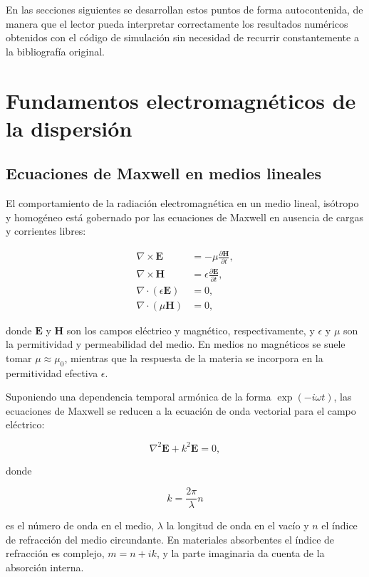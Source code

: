 \documentclass[12pt,a4paper]{article}
\begin{document}
En las secciones siguientes se desarrollan estos puntos de forma autocontenida, de manera que el lector pueda interpretar correctamente los resultados numéricos obtenidos con
el código de simulación sin necesidad de recurrir constantemente a la bibliografía original.


\section{Fundamentos electromagnéticos de la dispersión}

\subsection{Ecuaciones de Maxwell en medios lineales}

El comportamiento de la radiación electromagnética en un medio lineal, isótropo y homogéneo está gobernado por las ecuaciones de Maxwell en ausencia de cargas y corrientes libres:

\begin{align}
  \nabla \times \mathbf{E} &= -\mu \frac{\partial \mathbf{H}}{\partial t}, \\
  \nabla \times \mathbf{H} &=  \epsilon \frac{\partial \mathbf{E}}{\partial t}, \\
  \nabla \cdot (\epsilon \mathbf{E}) &= 0, \\
  \nabla \cdot (\mu \mathbf{H}) &= 0,
\end{align}

donde $\mathbf{E}$ y $\mathbf{H}$ son los campos eléctrico y magnético, respectivamente, y $\epsilon$ y $\mu$ son la permitividad y permeabilidad del medio.
En medios no magnéticos se suele tomar $\mu \approx \mu_0$, mientras que la respuesta de la materia se incorpora en la permitividad efectiva $\epsilon$.

Suponiendo una dependencia temporal armónica de la forma $\exp(-i\omega t)$, las ecuaciones de Maxwell se reducen a la ecuación de onda vectorial para el campo eléctrico:

\begin{equation}
  \nabla^2 \mathbf{E} + k^2 \mathbf{E} = 0,
\end{equation}

donde

\begin{equation}
  k = \frac{2\pi}{\lambda} n
\end{equation}

es el número de onda en el medio, $\lambda$ la longitud de onda en el vacío y $n$ el índice de refracción del medio circundante.
En materiales absorbentes el índice de refracción es complejo, $m = n + i k$, y la parte imaginaria da cuenta de la absorción interna.
\end{document}
